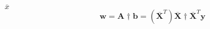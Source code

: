 \documentclass[12pt,a4paper]{report}
\begin{document}
$\overline{x}$
$$\textbf{w} = \textbf{A}\dagger \textbf{b} = (\overline{\textbf{X}}^T )\overline{\textbf{X}} \dagger \overline{\textbf{X}}^T \textbf{y}$$ 
 
\end{document}
